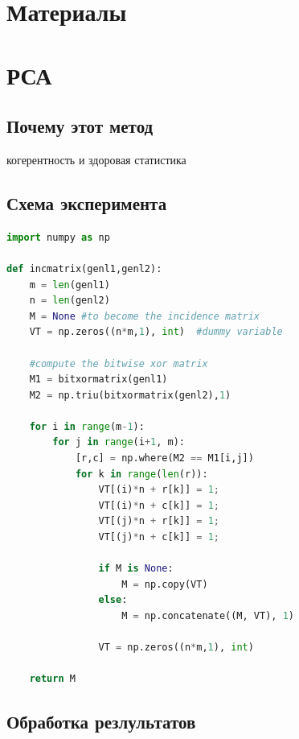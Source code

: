 

	\section{Материалы}
	
	
	
	\section{РСА}
	
	\subsection{Почему этот метод}
	когерентность и здоровая статистика
	
	
	\subsection{Схема эксперимента}
	
	\begin{lstlisting}[language=Python, caption=Python example]
import numpy as np
 
def incmatrix(genl1,genl2):
    m = len(genl1)
    n = len(genl2)
    M = None #to become the incidence matrix
    VT = np.zeros((n*m,1), int)  #dummy variable
 
    #compute the bitwise xor matrix
    M1 = bitxormatrix(genl1)
    M2 = np.triu(bitxormatrix(genl2),1) 
 
    for i in range(m-1):
        for j in range(i+1, m):
            [r,c] = np.where(M2 == M1[i,j])
            for k in range(len(r)):
                VT[(i)*n + r[k]] = 1;
                VT[(i)*n + c[k]] = 1;
                VT[(j)*n + r[k]] = 1;
                VT[(j)*n + c[k]] = 1;
 
                if M is None:
                    M = np.copy(VT)
                else:
                    M = np.concatenate((M, VT), 1)
 
                VT = np.zeros((n*m,1), int)
 
    return M
\end{lstlisting}
	
	
	\subsection{Обработка резлультатов}
	
